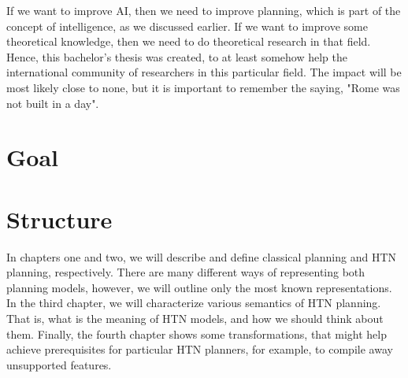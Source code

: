 \medskip\noindent
If we want to improve AI, then we need to improve planning, which is part of the concept of intelligence, as we discussed earlier. If we want to improve some theoretical knowledge, then we need to do theoretical research in that field. Hence, this bachelor's thesis was created, to at least somehow help the international community of researchers in this particular field. The impact will be most likely close to none, but it is important to remember the saying, "Rome was not built in a day".

\section*{Goal}

\noindent
{}

\section*{Structure}

\noindent
In chapters one and two, we will describe and define classical planning and HTN planning, respectively. There are many different ways of representing both planning models, however, we will outline only the most known representations. In the third chapter, we will characterize various semantics of HTN planning. That is, what is the meaning of HTN models, and how we should think about them. Finally, the fourth chapter shows some transformations, that might help achieve prerequisites for particular HTN planners, for example, to compile away unsupported features.